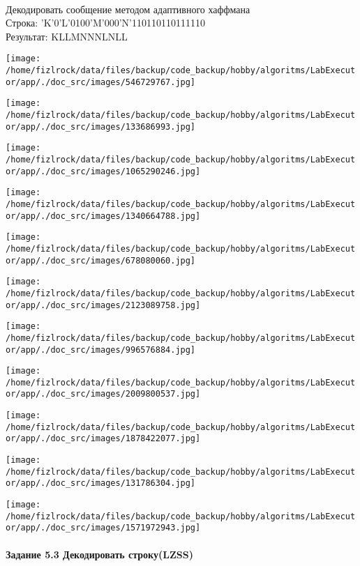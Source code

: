 \documentclass[a4paper, 12pt]{article}
\begin{document}
\\ 

Декодировать сообщение методом адаптивного хаффмана \\
Строка: 
'K'0'L'0100'M'000'N'110110110111110\\
Результат: KLLMNNNLNLL

\texttt{[image: /home/fizlrock/data/files/backup/code\_backup/hobby/algoritms/LabExecutor/app/./doc\_src/images/546729767.jpg]}

\texttt{[image: /home/fizlrock/data/files/backup/code\_backup/hobby/algoritms/LabExecutor/app/./doc\_src/images/133686993.jpg]}

\texttt{[image: /home/fizlrock/data/files/backup/code\_backup/hobby/algoritms/LabExecutor/app/./doc\_src/images/1065290246.jpg]}

\texttt{[image: /home/fizlrock/data/files/backup/code\_backup/hobby/algoritms/LabExecutor/app/./doc\_src/images/1340664788.jpg]}

\texttt{[image: /home/fizlrock/data/files/backup/code\_backup/hobby/algoritms/LabExecutor/app/./doc\_src/images/678080060.jpg]}

\texttt{[image: /home/fizlrock/data/files/backup/code\_backup/hobby/algoritms/LabExecutor/app/./doc\_src/images/2123089758.jpg]}

\texttt{[image: /home/fizlrock/data/files/backup/code\_backup/hobby/algoritms/LabExecutor/app/./doc\_src/images/996576884.jpg]}

\texttt{[image: /home/fizlrock/data/files/backup/code\_backup/hobby/algoritms/LabExecutor/app/./doc\_src/images/2009800537.jpg]}

\texttt{[image: /home/fizlrock/data/files/backup/code\_backup/hobby/algoritms/LabExecutor/app/./doc\_src/images/1878422077.jpg]}

\texttt{[image: /home/fizlrock/data/files/backup/code\_backup/hobby/algoritms/LabExecutor/app/./doc\_src/images/131786304.jpg]}

\texttt{[image: /home/fizlrock/data/files/backup/code\_backup/hobby/algoritms/LabExecutor/app/./doc\_src/images/1571972943.jpg]}
\pagebreak
\paragraph{Задание 5.3 Декодировать строку(LZSS)\\}
\end{document}

